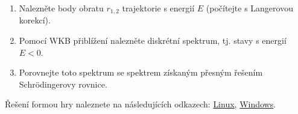     \begin{enumerate}
        \item 
            Nalezněte body obratu $r_{1,2}$ trajektorie s energií $E$ (počítejte s Langerovou korekcí).
        
        \item 
            Pomocí WKB přiblížení nalezněte diskrétní spektrum, tj. stavy s energií $E<0$.
        
        \item
            Porovnejte toto spektrum se spektrem získaným přesným řešením Schrödingerovy rovnice.
    \end{enumerate}

    \begin{solution}
        Řešení formou hry naleznete na následujících odkazech:
        \href{http://pavelstransky.cz/cviceniktvt/WKBLanger_1.1_linux.zip}{Linux},
        \href{http://pavelstransky.cz/cviceniktvt/WKBLanger_1.1_windows.zip}{Windows}.
    \end{solution}
